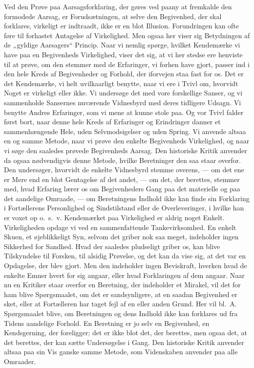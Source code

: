 \documentclass[12pt,a4paper]{article}
\newcommand{\opage}[1]{\marginnote{\footnotesize\textit{[#1]}}}
\begin{document}
Ved den Prøve paa Aarsagsforklaring, der gøres ved paany at fremkalde den
formodede Aarsag, er Forudsætningen, at selve den Begivenhed, der skal
forklares, virkeligt er indtraadt, ikke er en blot Illusion. Forundringen
kan ofte føre til forhastet Antagelse af Virkelighed. Men ogsaa her viser
sig Betydningen af de „gyldige Aarsagers“ Princip. Naar vi nemlig spørge,
hvilket Kendemærke vi have paa en Begivenheds Virkelighed, viser det sig, at
vi her stedse ere henviste til at prøve, om den stemmer med de Erfaringer,
vi forhen have gjort, passer ind i den hele Kreds af Begivenheder og
Forhold, der iforvejen staa fast for os. Det er det Kendemærke, vi helt
uvilkaarligt benytte, naar vi ere i Tvivl om, hvorvidt Noget er virkeligt
eller ikke. Vi undersøge det med vore forskellige Sanser, og vi sammenholde
Sansernes nuværende Vidnesbyrd med deres tidligere Udsagn. Vi benytte Andres
Erfaringer, som vi mene at kunne stole paa. Og vor Tvivl falder først bort,
naar denne hele Kreds af Erfaringer og Erindringer danner et sammenhængende
Hele, uden Selvmodsigelser og uden Spring. Vi anvende altsaa en og samme
Metode, naar \opage{28} vi prøve den enkelte Begivenheds Virkelighed, og naar vi søge
den saaledes prøvede Begivenheds Aarsag. Den historiske Kritik anvender da
ogsaa nødvendigvis denne Metode, hvilke Beretninger den saa staar overfor.
Den undersøger, hvorvidt de enkelte Vidnesbyrd stemme overens, --- om det
ene er Mere end en blot Gentagelse af det andet, --- om det, der berettes,
stemmer med, hvad Erfaring lærer os om Begivenheders Gang paa det materielle
og paa det aandelige Omraade, --- om Beretningens Indhold ikke kan finde sin
Forklaring i Fortællerens Personlighed og Sindstilstand eller de
Overleveringer, i hvilke han er voxet op o.\ s.\ v. Kendemærket paa
Virkelighed er aldrig noget Enkelt. Virkeligheden opdage vi ved en
sammenfattende Tankevirksomhed. En enkelt Skuen, et øjeblikkeligt Syn,
selvom det griber nok saa meget, indeholder ingen Sikkerhed for Sandhed.
Hvad der saaledes pludseligt griber os, kan blive Tilskyndelse til Forsken,
til alsidig Prøvelse, og det kan da vise sig, at det var en Opdagelse, der
blev gjort. Men den indeholder ingen Beviskraft, hverken hvad de enkelte
Emner hvert for sig angaar, eller hvad Forklaringen af dem angaar. Naar nu
en Kritiker staar overfor en Beretning, der indeholder et Mirakel, vil det
for ham blive Spørgsmaalet, om det er sandsynligere, at en saadan Begivenhed
er sket, eller at Fortælleren har taget fejl af en eller anden Grund. Her
vil bl.\ A. Spørgsmaalet blive, om Beretningen og dens Indhold ikke kan
forklares ud fra Tidens aandelige Forhold. En Beretning er jo selv en
Begivenhed, en Kendsgerning, der foreligger; det er ikke blot det, der
berettes, men ogsaa det, at det berettes, der kan sætte Undersøgelse i Gang.
Den historiske Kritik anvender altsaa paa sin Vis ganske samme Metode, som
Videnskaben anvender paa alle Omraader.
\end{document}
